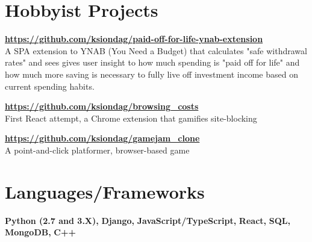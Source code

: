 \documentclass{res}
\begin{document}
\begin{resume}
  \vspace{0.1in}
  
  
  \section{Hobbyist Projects}
   {\bf \url{https://github.com/ksiondag/paid-off-for-life-ynab-extension}}\\
  A SPA extension to YNAB (You Need a Budget) that calculates "safe withdrawal rates" and sees gives user insight to how
  much spending is "paid off for life" and how much more saving is necessary to fully live off investment income based on
  current spending habits.
  
  \vspace{-5pt}
  {\bf \url{https://github.com/ksiondag/browsing_costs}}\\
  First React attempt, a Chrome extension that gamifies site-blocking
  
  \vspace{-5pt}
  {\bf \url{https://github.com/ksiondag/gamejam_clone}}\\
  A point-and-click platformer, browser-based game
  
  
  
  \section{Languages/Frameworks}
  \vspace{0.1in}
  {\bf Python (2.7 and 3.X),}
  {\bf Django,}
  {\bf JavaScript/TypeScript,}
  {\bf React,}
  {\bf SQL,}
  {\bf MongoDB,}
  {\bf C++}
  
\end{resume}
\end{document}
